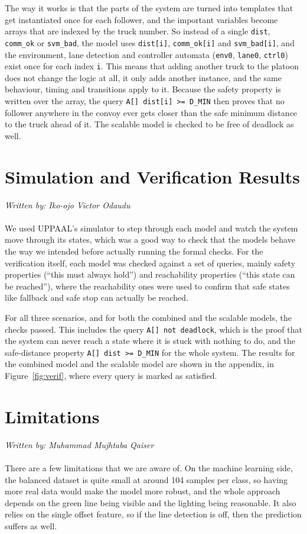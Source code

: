 \documentclass[english]{lni}
\begin{document}
The way it works is that the parts of the system are turned into templates that get instantiated once for each follower, and the important variables become arrays that are indexed by the truck number. So instead of a single \texttt{dist}, \texttt{comm\_ok} or \texttt{svm\_bad}, the model uses \texttt{dist[i]}, \texttt{comm\_ok[i]} and \texttt{svm\_bad[i]}, and the environment, lane detection and controller automata (\texttt{env0}, \texttt{lane0}, \texttt{ctrl0}) exist once for each index \texttt{i}. This means that adding another truck to the platoon does not change the logic at all, it only adds another instance, and the same behaviour, timing and transitions apply to it. Because the safety property is written over the array, the query \texttt{A[] dist[i] >= D\_MIN} then proves that no follower anywhere in the convoy ever gets closer than the safe minimum distance to the truck ahead of it. The scalable model is checked to be free of deadlock as well.

\section{Simulation and Verification Results}
\textit{Written by: Iko-ojo Victor Odaudu}
\\~\\
We used UPPAAL's simulator to step through each model and watch the system move through its states, which was a good way to check that the models behave the way we intended before actually running the formal checks. For the verification itself, each model was checked against a set of queries, mainly safety properties (``this must always hold'') and reachability properties (``this state can be reached''), where the reachability ones were used to confirm that safe states like fallback and safe stop can actually be reached.

For all three scenarios, and for both the combined and the scalable models, the checks passed. This includes the query \texttt{A[] not deadlock}, which is the proof that the system can never reach a state where it is stuck with nothing to do, and the safe-distance property \texttt{A[] dist >= D\_MIN} for the whole system. The results for the combined model and the scalable model are shown in the appendix, in Figure~\ref{fig:verif}, where every query is marked as satisfied.

\section{Limitations}
\textit{Written by: Muhammad Mujhtaba Qaiser}
\\~\\
There are a few limitations that we are aware of. On the machine learning side, the balanced dataset is quite small at around 104 samples per class, so having more real data would make the model more robust, and the whole approach depends on the green line being visible and the lighting being reasonable. It also relies on the single offset feature, so if the line detection is off, then the prediction suffers as well.
\end{document}
